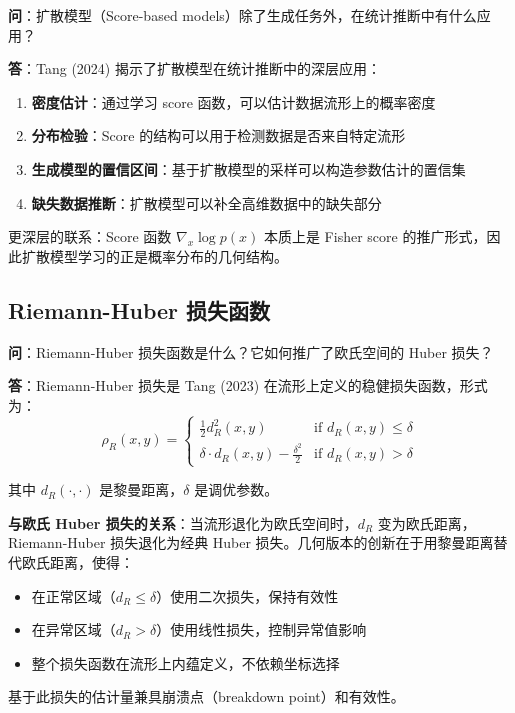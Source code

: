 \textbf{问}：扩散模型（Score-based models）除了生成任务外，在统计推断中有什么应用？

\textbf{答}：Tang (2024) 揭示了扩散模型在统计推断中的深层应用：

\begin{enumerate}
    \item \textbf{密度估计}：通过学习 score 函数，可以估计数据流形上的概率密度
    \item \textbf{分布检验}：Score 的结构可以用于检测数据是否来自特定流形
    \item \textbf{生成模型的置信区间}：基于扩散模型的采样可以构造参数估计的置信集
    \item \textbf{缺失数据推断}：扩散模型可以补全高维数据中的缺失部分
\end{enumerate}

更深层的联系：Score 函数 $\nabla_x \log p(x)$ 本质上是 Fisher score 的推广形式，因此扩散模型学习的正是概率分布的几何结构。

\subsection{Riemann-Huber 损失函数}\label{sec:qa-riemann-huber-loss}

\textbf{问}：Riemann-Huber 损失函数是什么？它如何推广了欧氏空间的 Huber 损失？

\textbf{答}：Riemann-Huber 损失是 Tang (2023) 在流形上定义的稳健损失函数，形式为：
$$\rho_R(x, y) = \begin{cases} \frac{1}{2} d_R^2(x, y) & \text{if } d_R(x, y) \leq \delta \\ \delta \cdot d_R(x, y) - \frac{\delta^2}{2} & \text{if } d_R(x, y) > \delta \end{cases}$$

其中 $d_R(\cdot, \cdot)$ 是黎曼距离，$\delta$ 是调优参数。

\textbf{与欧氏 Huber 损失的关系}：当流形退化为欧氏空间时，$d_R$ 变为欧氏距离，Riemann-Huber 损失退化为经典 Huber 损失。几何版本的创新在于用黎曼距离替代欧氏距离，使得：
\begin{itemize}
    \item 在正常区域（$d_R \leq \delta$）使用二次损失，保持有效性
    \item 在异常区域（$d_R > \delta$）使用线性损失，控制异常值影响
    \item 整个损失函数在流形上内蕴定义，不依赖坐标选择
\end{itemize}

基于此损失的估计量兼具崩溃点（breakdown point）和有效性。

